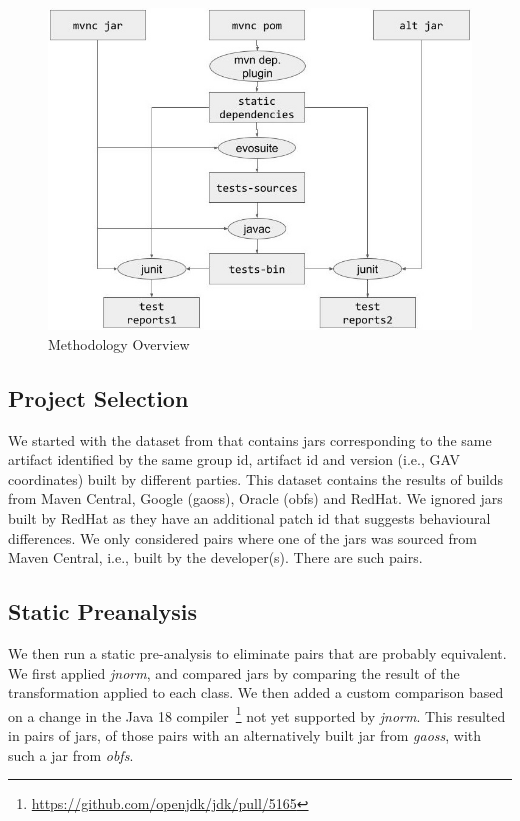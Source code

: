\documentclass[conference]{IEEEtran}
\newcommand{\inputgen}[1]{\unskip}
\begin{document}
\begin{figure}[ht!]
	\centering
	\includegraphics[width=\columnwidth]{methodology.jpg}
	\caption{Methodology Overview \label{fig:methodology}}
\end{figure}


\subsection{Project Selection}

We started with the dataset from \cite{dietrich2024levelsbinaryequivalencecomparison} that contains jars corresponding to the same artifact identified by the same group id, artifact id and version (i.e., GAV coordinates) built by different parties. This dataset contains the results of builds from Maven Central, Google (gaoss), Oracle (obfs) and  RedHat. We ignored jars built by RedHat as they have an additional patch id that suggests behavioural differences.  We only considered pairs where one of the jars was sourced from Maven Central, i.e., built by the developer(s). There are \inputgen{num-pairs-of-binaries} such pairs.


\subsection{Static Preanalysis}

We then run a static pre-analysis to eliminate pairs that are probably equivalent. We first applied \textit{jnorm}, and compared jars by comparing the result of the transformation applied to each class. We then added a custom comparison based on a change in the Java 18 compiler~\footnote{\url{https://github.com/openjdk/jdk/pull/5165}} not yet supported by \textit{jnorm}. This resulted in \inputgen{num-jar-pairs-after-invokevirtual-invokeinterface} pairs of jars, \inputgen{num-jar-pairs-after-invokevirtual-invokeinterface-gaoss} of those pairs with an alternatively built jar from \textit{gaoss}, \inputgen{num-jar-pairs-after-invokevirtual-invokeinterface-obfs} with such a jar from \textit{obfs}.
\end{document}
